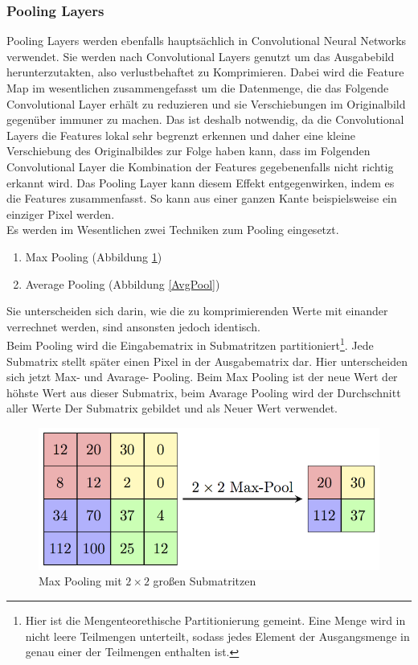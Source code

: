 \documentclass[11pt]{article}
\begin{document}
\subsubsection{Pooling Layers}
Pooling Layers werden ebenfalls hauptsächlich in Convolutional Neural Networks verwendet. Sie werden nach Convolutional Layers genutzt um das Ausgabebild herunterzutakten, also verlustbehaftet zu Komprimieren. Dabei wird die Feature Map im wesentlichen zusammengefasst um die Datenmenge, die das Folgende Convolutional Layer erhält zu reduzieren und sie Verschiebungen im Originalbild gegenüber immuner zu machen. Das ist deshalb notwendig, da die Convolutional Layers die Features lokal sehr begrenzt erkennen und daher eine kleine Verschiebung des Originalbildes zur Folge haben kann, dass im Folgenden Convolutional Layer die Kombination der Features gegebenenfalls nicht richtig erkannt wird. Das Pooling Layer kann diesem Effekt entgegenwirken, indem es die Features zusammenfasst. So kann aus einer ganzen Kante beispielsweise ein einziger Pixel werden.\\
Es werden im Wesentlichen zwei Techniken zum Pooling eingesetzt. 
\begin{enumerate}
	\item Max Pooling (Abbildung \ref{Maxpool})
	\item Average Pooling (Abbildung \ref{AvgPool})
\end{enumerate}
Sie unterscheiden sich darin, wie die zu komprimierenden Werte mit einander verrechnet werden, sind ansonsten jedoch identisch.\\
Beim Pooling wird die Eingabematrix in Submatritzen partitioniert\footnote{Hier ist die Mengenteorethische Partitionierung gemeint. Eine Menge wird in nicht leere Teilmengen unterteilt, sodass jedes Element der Ausgangsmenge in genau einer der Teilmengen enthalten ist.}. Jede Submatrix stellt später einen Pixel in der Ausgabematrix dar. Hier unterscheiden sich jetzt Max- und Avarage- Pooling. Beim Max Pooling ist der neue Wert der höhste Wert aus dieser Submatrix, beim Avarage Pooling wird der Durchschnitt aller Werte Der Submatrix gebildet und als Neuer Wert verwendet.
\begin{figure}[h]
	\centering
	\includegraphics[width=0.7\linewidth]{../graphics/MaxpoolSample2.png}
	\caption[Max Pooling mit $2\times2$ großen Submatritzen\newline
	Quelle: https://computersciencewiki.org/index.php/Max-pooling\_/\_Pooling\\
	CC BY NC SA Lizenz]{Max Pooling mit $2\times2$ großen Submatritzen}
	\label{Maxpool}
\end{figure}
\end{document}
